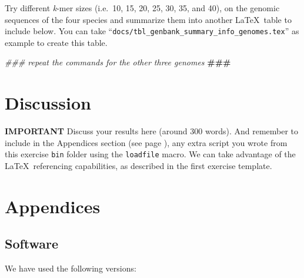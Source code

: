\documentclass[10pt,a4paper,]{article}
\newenvironment{Shaded}{}{}
\newcommand{\AlertTok}[1]{\textcolor[rgb]{1.00,0.00,0.00}{\textbf{#1}}}
\newcommand{\CommentTok}[1]{\textcolor[rgb]{0.38,0.63,0.69}{\textit{#1}}}
\newcommand{\ExtensionTok}[1]{#1}
\newcommand{\FunctionTok}[1]{\textcolor[rgb]{0.02,0.16,0.49}{#1}}
\newcommand{\NormalTok}[1]{#1}
\begin{document}
Try different \emph{k}-mer sizes (i.e.~10, 15, 20, 25, 30, 35, and 40),
on the genomic sequences of the four species and summarize them into
another \LaTeX~table to include below. You can take
``\texttt{docs/tbl\_genbank\_summary\_info\_genomes.tex}'' as example to
create this table.

\begin{Shaded}
\begin{Highlighting}[]
\CommentTok{### repeat the commands for the other three genomes }\AlertTok{###}
\end{Highlighting}
\end{Shaded}

\hypertarget{discussion}{%
\section{Discussion}\label{discussion}}

\textbf{IMPORTANT} Discuss your results here (around 300 words). And
remember to include in the Appendices section (see page
\pageref{sec:appendices}), any extra script you wrote from this exercise
\texttt{bin} folder using the \texttt{loadfile} macro. We can take
advantage of the \LaTeX~referencing capabilities, as described in the
first exercise template.

\clearpage

\hypertarget{appendices}{%
\section{Appendices}\label{appendices}}

\label{sec:appendices}

\hypertarget{software}{%
\subsection{Software}\label{software}}

We have used the following versions:

\begin{Shaded}
\end{Shaded}
\end{document}
